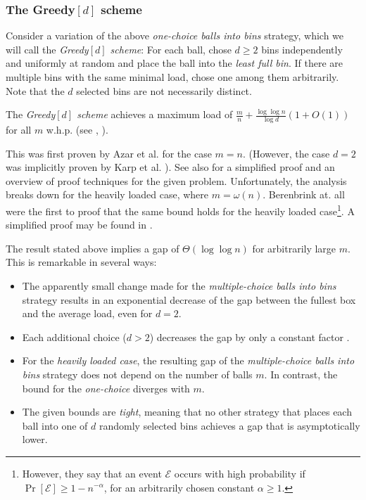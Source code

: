 \documentclass{acm_proc_article-sp}
\begin{document}
\subsubsection{The Greedy$[d]$ scheme}
\label{sec:greedy}

Consider a variation of the above \emph{one-choice balls into bins} strategy, which we will call the \emph{Greedy$[d]$ scheme}: For each ball, chose $d \geq 2$ bins independently and uniformly at random and place the ball into the \emph{least full bin}. If there are multiple bins with the same minimal load, chose one among them arbitrarily. Note that the $d$ selected bins are not necessarily distinct. 

The \emph{Greedy$[d]$ scheme} achieves a maximum load of $\frac{m}{n} + \frac{\log \log n}{\log d} \left( 1 + O\left(1\right)\right)$ for all $m$ w.h.p. (see \cite{ABKU99}, \cite{BCSV06}).


This was first proven by Azar et al. \cite{ABKU99} for the case $m = n$. (However, the case $d = 2$ was implicitly proven by Karp et al. \cite{KLM92}). See also \cite{MRS01} for a simplified proof and an overview of proof techniques for the given problem.  Unfortunately, the analysis breaks down for the heavily loaded case, where $m = \omega\left(n\right)$. Berenbrink at. all \cite{BFZR08} were the first to proof that the same bound holds for the heavily loaded case\footnote{However, they say that an event $\mathcal E$ occurs with high probability if $\Pr\left[\mathcal E \right]  \geq 1- n^{-\alpha}$, for an arbitrarily chosen constant $\alpha \geq 1$.}. A simplified proof may be found in \cite{TW13}. 

The result stated above implies a gap of $\Theta\left(\log \log n \right)$ for arbitrarily large $m$. This is remarkable in several ways:
\begin{itemize}
\item The apparently small change made for the \emph{multiple-choice balls into bins} strategy results in an exponential decrease of the gap between the fullest box and the average load, even for $d=2$. 
\item Each additional choice ($d > 2$) decreases the gap by only a constant factor \cite{MRS01}. 
\item For the \emph{heavily loaded case}, the resulting gap of the \emph{multiple-choice balls into bins} strategy does not depend on the number of balls $m$. In contrast, the bound for the \emph{one-choice} diverges with $m$.
\item The given bounds are \emph{tight}, meaning that no other strategy that places each ball into one of $d$ randomly selected bins achieves a gap that is asymptotically lower.
\end{itemize}
\end{document}
